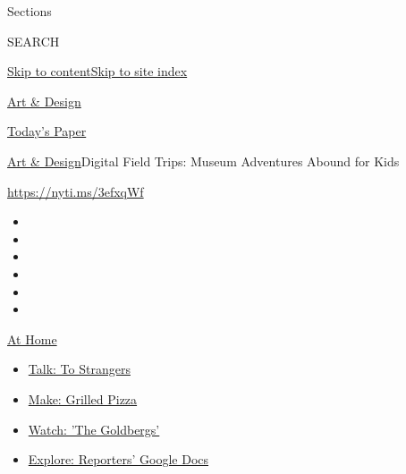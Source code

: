 Sections

SEARCH

\protect\hyperlink{site-content}{Skip to
content}\protect\hyperlink{site-index}{Skip to site index}

\href{https://www.nytimes3xbfgragh.onion/section/arts/design}{Art \&
Design}

\href{https://myaccount.nytimes3xbfgragh.onion/auth/login?response_type=cookie\&client_id=vi}{}

\href{https://www.nytimes3xbfgragh.onion/section/todayspaper}{Today's
Paper}

\href{/section/arts/design}{Art \& Design}\textbar{}Digital Field Trips:
Museum Adventures Abound for Kids

\url{https://nyti.ms/3efxqWf}

\begin{itemize}
\item
\item
\item
\item
\item
\item
\end{itemize}

\href{https://www.nytimes3xbfgragh.onion/spotlight/at-home?action=click\&pgtype=Article\&state=default\&region=TOP_BANNER\&context=at_home_menu}{At
Home}

\begin{itemize}
\tightlist
\item
  \href{https://www.nytimes3xbfgragh.onion/2020/08/03/well/family/the-benefits-of-talking-to-strangers.html?action=click\&pgtype=Article\&state=default\&region=TOP_BANNER\&context=at_home_menu}{Talk:
  To Strangers}
\item
  \href{https://www.nytimes3xbfgragh.onion/2020/08/01/at-home/coronavirus-make-pizza-on-a-grill.html?action=click\&pgtype=Article\&state=default\&region=TOP_BANNER\&context=at_home_menu}{Make:
  Grilled Pizza}
\item
  \href{https://www.nytimes3xbfgragh.onion/2020/07/31/arts/television/goldbergs-abc-stream.html?action=click\&pgtype=Article\&state=default\&region=TOP_BANNER\&context=at_home_menu}{Watch:
  'The Goldbergs'}
\item
  \href{https://www.nytimes3xbfgragh.onion/interactive/2020/at-home/even-more-reporters-editors-diaries-lists-recommendations.html?action=click\&pgtype=Article\&state=default\&region=TOP_BANNER\&context=at_home_menu}{Explore:
  Reporters' Google Docs}
\end{itemize}

